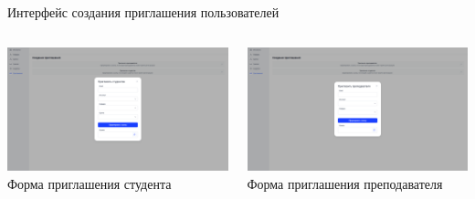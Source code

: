 \documentclass[aspectratio=169]{beamer}
\begin{document}
\begin{frame}{Интерфейс создания приглашения пользователей}
\vspace{0.5em}

\begin{columns}
    \begin{column}{0.5\textwidth}
        \centering
        \includegraphics[width=0.95\linewidth]{static/InviteStudentPage.png} \\
        \small Форма приглашения студента
    \end{column}
    \begin{column}{0.5\textwidth}
        \centering
        \includegraphics[width=0.95\linewidth]{static/InviteTeacherPage.png} \\
        \small Форма приглашения преподавателя
    \end{column}
\end{columns}
\end{frame}
\end{document}
